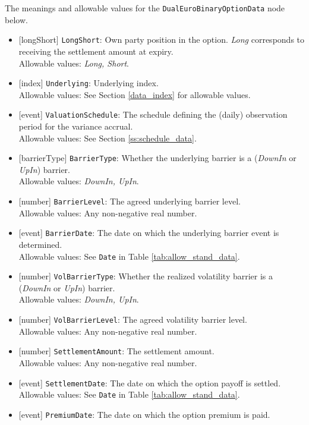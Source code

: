 The meanings and allowable values for the \lstinline!DualEuroBinaryOptionData! node below.
\begin{itemize}
  \item{}[longShort] \lstinline!LongShort!: Own party position in the option. \emph{Long} corresponds to receiving the settlement amount at expiry. \\
  Allowable values: \emph{Long, Short}.
  \item{}[index] \lstinline!Underlying!: Underlying index. \\
  Allowable values: See Section \ref{data_index} for allowable values.
  \item{}[event] \lstinline!ValuationSchedule!: The schedule defining the (daily) observation period for the variance accrual. \\
  Allowable values: See Section \ref{ss:schedule_data}.
  \item{}[barrierType] \lstinline!BarrierType!: Whether the underlying barrier is a (\emph{DownIn} or \emph{UpIn}) barrier. \\
  Allowable values: \emph{DownIn, UpIn}.
  \item{}[number] \lstinline!BarrierLevel!: The agreed underlying barrier level. \\
  Allowable values: Any non-negative real number.
  \item{}[event] \lstinline!BarrierDate!: The date on which the underlying barrier event is determined. \\
  Allowable values: See \lstinline!Date! in Table \ref{tab:allow_stand_data}.
  \item{}[number] \lstinline!VolBarrierType!: Whether the realized volatility barrier is a (\emph{DownIn} or \emph{UpIn}) barrier. \\
  Allowable values: \emph{DownIn, UpIn}.
  \item{}[number] \lstinline!VolBarrierLevel!: The agreed volatility barrier level. \\
  Allowable values: Any non-negative real number.
  \item{}[number] \lstinline!SettlementAmount!: The settlement amount. \\
  Allowable values: Any non-negative real number.
  \item{}[event] \lstinline!SettlementDate!: The date on which the option payoff is settled. \\
  Allowable values: See \lstinline!Date! in Table \ref{tab:allow_stand_data}.
  \item{}[event] \lstinline!PremiumDate!: The date on which the option premium is paid. \\

\end{itemize}
